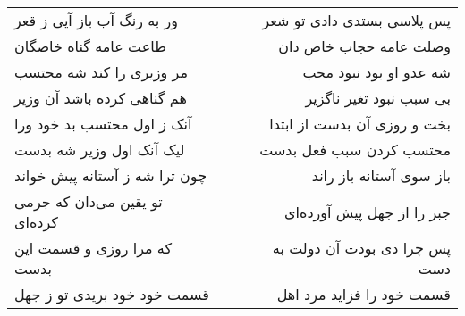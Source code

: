 \begin{center}
\begin{longtable}{l p{0.5cm} r}
\\
ور به رنگ آب باز آیی ز قعر
&&
پس پلاسی بستدی دادی تو شعر
\\
طاعت عامه گناه خاصگان
&&
وصلت عامه حجاب خاص دان
\\
مر وزیری را کند شه محتسب
&&
شه عدو او بود نبود محب
\\
هم گناهی کرده باشد آن وزیر
&&
بی سبب نبود تغیر ناگزیر
\\
آنک ز اول محتسب بد خود ورا
&&
بخت و روزی آن بدست از ابتدا
\\
لیک آنک اول وزیر شه بدست
&&
محتسب کردن سبب فعل بدست
\\
چون ترا شه ز آستانه پیش خواند
&&
باز سوی آستانه باز راند
\\
تو یقین می‌دان که جرمی کرده‌ای
&&
جبر را از جهل پیش آورده‌ای
\\
که مرا روزی و قسمت این بدست
&&
پس چرا دی بودت آن دولت به دست
\\
قسمت خود خود بریدی تو ز جهل
&&
قسمت خود را فزاید مرد اهل
\\
\end{longtable}
\end{center}
